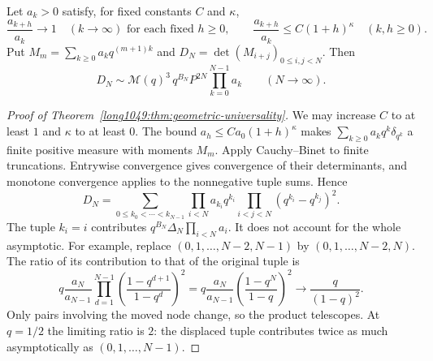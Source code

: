 \begin{theorem}
\label{long1049:thm:geometric-universality}
Let $a_k>0$ satisfy, for fixed constants $C$ and $\kappa$,
\[
 \frac{a_{k+h}}{a_k}\longrightarrow1\quad(k\to\infty)
 \text{ for each fixed }h\ge0,
 \qquad
 \frac{a_{k+h}}{a_k}\le C(1+h)^\kappa\quad(k,h\ge0).
\]
Put $M_m=\sum_{k\ge0}a_kq^{(m+1)k}$ and $D_N=\det(M_{i+j})_{0\le i,j<N}$. Then
\[
 D_N\sim\mathcal M(q)^3\,q^{B_N}P^{2N}\prod_{k=0}^{N-1}a_k
 \qquad(N\to\infty).
\]
\end{theorem}

\begin{proof}[Proof of Theorem~\ref{long1049:thm:geometric-universality}]
We may increase $C$ to at least $1$ and $\kappa$ to at least $0$.
The bound $a_h\le Ca_0(1+h)^\kappa$ makes
$\sum_{k\ge0}a_kq^k\delta_{q^k}$ a finite positive measure with
moments $M_m$. Apply Cauchy--Binet to finite truncations. Entrywise
convergence gives convergence of their determinants, and monotone
convergence applies to the nonnegative tuple sums. Hence
\begin{equation}\label{long1049:eq:polynomial-heine}
 D_N=\sum_{0\le k_0<\cdots<k_{N-1}}
 \prod_{i<N}a_{k_i}q^{k_i}
 \prod_{i<j<N}(q^{k_i}-q^{k_j})^2.
\end{equation}
The tuple $k_i=i$ contributes $q^{B_N}\Delta_N\prod_{i<N}a_i$.
It does not account for the whole asymptotic. For example, replace
$(0,1,\ldots,N-2,N-1)$ by $(0,1,\ldots,N-2,N)$. The ratio of
its contribution to that of the original tuple is
\begin{equation}\label{long1049:eq:last-node-shift}
 q\frac{a_N}{a_{N-1}}
 \prod_{d=1}^{N-1}\left(\frac{1-q^{d+1}}{1-q^d}\right)^2
 =q\frac{a_N}{a_{N-1}}\left(\frac{1-q^N}{1-q}\right)^2
 \longrightarrow\frac{q}{(1-q)^2}.
\end{equation}
Only pairs involving the moved node change, so the product
telescopes. At $q=1/2$ the limiting ratio is $2$: the displaced tuple
contributes twice as much asymptotically as $(0,1,\ldots,N-1)$.


\end{proof}
